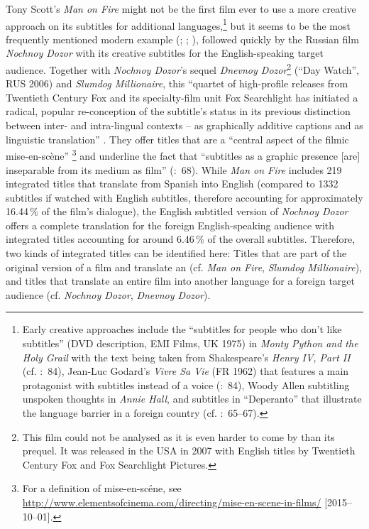 Tony Scott’s \textit{Man on Fire} might not be the first film ever to use a more creative approach on its subtitles for additional languages,\footnote{Early creative approaches include the “subtitles for people who don’t like subtitles” (DVD description, EMI Films, UK 1975) in \textit{Monty Python and the Holy Grail} with the text being taken from Shakespeare’s \textit{Henry IV, Part II} (cf. \citealt{Foerster2010}:~84), Jean-Luc Godard’s \textit{Vivre Sa Vie} (FR 1962) that features a main protagonist with subtitles instead of a voice (\citeyear{Foerster2010}:~84), Woody Allen subtitling unspoken thoughts in \textit{Annie Hall}, and subtitles in “Deperanto” that illustrate the language barrier in a foreign country (cf. \citealt{rozema2004}:~65--67).} but it seems to be the most frequently mentioned modern example (\citealt{Kofoed2011}; \citealt{mcclarty2012}; \citealt{romero-fresco2013}), followed quickly by the Russian film \textit{Nochnoy Dozor} with its creative subtitles for the English-speaking target audience. Together with \textit{Nochnoy Dozor}’s sequel \textit{Dnevnoy Dozor}\footnote{This film could not be analysed as it is even harder to come by than its prequel. It was released in the USA in 2007 with English titles by Twentieth Century Fox and Fox Searchlight Pictures.} (“Day Watch”, RUS 2006) and \textit{Slumdog Millionaire}, this “quartet of high-profile releases from Twentieth Century Fox and its specialty-film unit Fox Searchlight has initiated a radical, popular re-conception of the subtitle’s status in its previous distinction between inter- and intra-lingual contexts – as graphically additive captions and as linguistic translation” \citep{Kofoed2011}. They offer titles that are a “central aspect of the filmic mise-en-scène” \citep{Kofoed2011}\footnote{For a definition of mise-en-scéne, see \url{http://www.elementsofcinema.com/directing/mise-en-scene-in-films/} [2015--10--01].} and underline the fact that “subtitles as a graphic presence [are] inseparable from its medium as film” (\citealt{Egoyan2004}:~68). While \textit{Man on Fire} includes 219 integrated titles that translate from Spanish into English (compared to 1332 subtitles if watched with English subtitles, therefore accounting for approximately 16.44\,\% of the film’s dialogue), the English subtitled version of \textit{Nochnoy Dozor} offers a complete translation for the foreign English-speaking audience with integrated titles accounting for around 6.46\,\% of the overall subtitles. Therefore, two kinds of integrated titles can be identified here: Titles that are part of the original version of a film and translate an  (cf. \textit{Man on Fire}, \textit{Slumdog Millionaire}), and titles that translate an entire film into another language for a foreign target audience (cf. \textit{Nochnoy Dozor}, \textit{Dnevnoy Dozor}).

